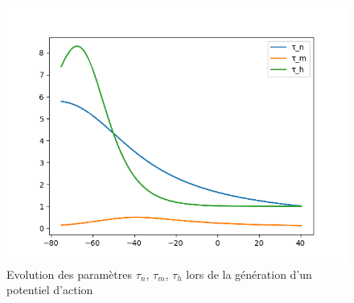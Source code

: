 \documentclass[12pt]{scrartcl}
\begin{document}
\begin{figure}[!h]
\centering
\includegraphics[scale=0.5]{imgs/hhtime.png}
\caption{Evolution des paramètres $\tau_n$, $\tau_m$, $\tau_h$ lors de la génération d'un potentiel d'action}
\label{hhtime}
\end{figure}
\end{document}
